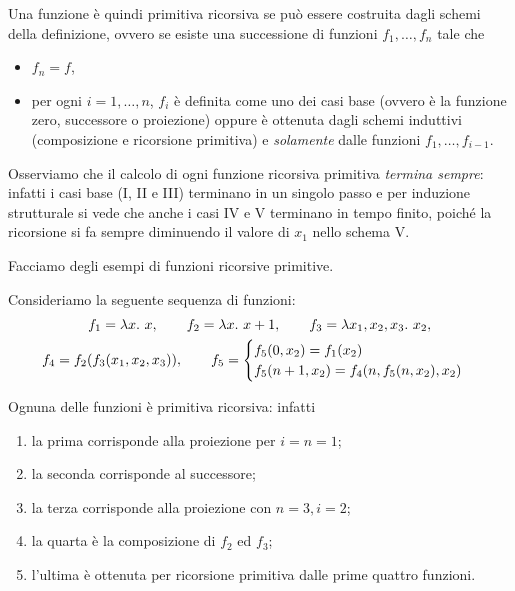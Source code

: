 Una funzione è quindi primitiva ricorsiva se può essere costruita dagli schemi della definizione, ovvero se esiste una successione di funzioni $f_1, \dots, f_n$ tale che \begin{itemize}
    \item $f_n = f$,
    \item per ogni $i = 1, \dots, n$, $f_i$ è definita come uno dei casi base (ovvero è la funzione zero, successore o proiezione) oppure è ottenuta dagli schemi induttivi (composizione e ricorsione primitiva) e \emph{solamente} dalle funzioni $f_1, \dots, f_{i-1}$.    
\end{itemize} 

Osserviamo che il calcolo di ogni funzione ricorsiva primitiva \emph{termina sempre}: infatti i casi base (I, II e III) terminano in un singolo passo e per induzione strutturale si vede che anche i casi IV e V terminano in tempo finito, poiché la ricorsione si fa sempre diminuendo il valore di $x_1$ nello schema V. 

Facciamo degli esempi di funzioni ricorsive primitive.

\begin{example}
    Consideriamo la seguente sequenza di funzioni: \begin{gather*}
        f_1 = \lambda{x}.\ {x}, \qquad f_2 = \lambda{x}.\ {x+1}, \qquad f_3 = \lambda{x_1, x_2, x_3}.\ {x_2},\\
        f_4 = f_2(f_3(x_1, x_2, x_3)), \qquad f_5 = \begin{cases}
            f_5(0, x_2) = f_1(x_2)\\
            f_5(n+1, x_2) = f_4(n, f_5(n, x_2), x_2)
        \end{cases}
    \end{gather*}

    Ognuna delle funzioni è primitiva ricorsiva: infatti \begin{enumerate}
        \item la prima corrisponde alla proiezione per $i = n = 1$;
        \item la seconda corrisponde al successore;
        \item la terza corrisponde alla proiezione con $n = 3, i = 2$;
        \item la quarta è la composizione di $f_2$ ed $f_3$;
        \item l'ultima è ottenuta per ricorsione primitiva dalle prime quattro funzioni.    
    \end{enumerate}
\end{example}

